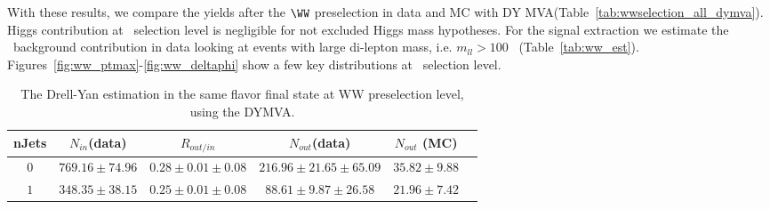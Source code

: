 With these results, we compare the yields after the $\WW$ preselection 
in data and MC with DY MVA(Table~\ref{tab:wwselection_all_dymva}). 
Higgs contribution at \WW\ selection level is negligible for not excluded Higgs mass
hypotheses. For the signal extraction we estimate the \WW\ background
contribution in data looking at events with large di-lepton mass, i.e.
$m_{ll}>100$~\GeV{} (Table~\ref{tab:ww_est}). 
Figures~\ref{fig:ww_ptmax}-\ref{fig:ww_deltaphi} show a few key distributions at \WW\ selection level.

\begin{table}
\begin{center}
\begin{tabular}{c c c c c c}
\hline
       nJets & $N_{in}$(data)        & $R_{out/in}$        & $N_{out}$(data)  & $N_{out}$ (MC) \\ 
\hline
$0$  & $769.16\pm74.96$ & $0.28\pm0.01\pm0.08$ & $216.96\pm21.65\pm65.09$ & $35.82\pm9.88$ \\ 
$1$  & $348.35\pm38.15$ & $0.25\pm0.01\pm0.08$ & $88.61\pm9.87\pm26.58$ & $21.96\pm7.42$ \\
\hline
\end{tabular}
\caption{The Drell-Yan estimation in the same flavor final state at WW preselection level, using the DYMVA.}
\label{tab:dy_wwlevel}
\end{center}
\end{table}

